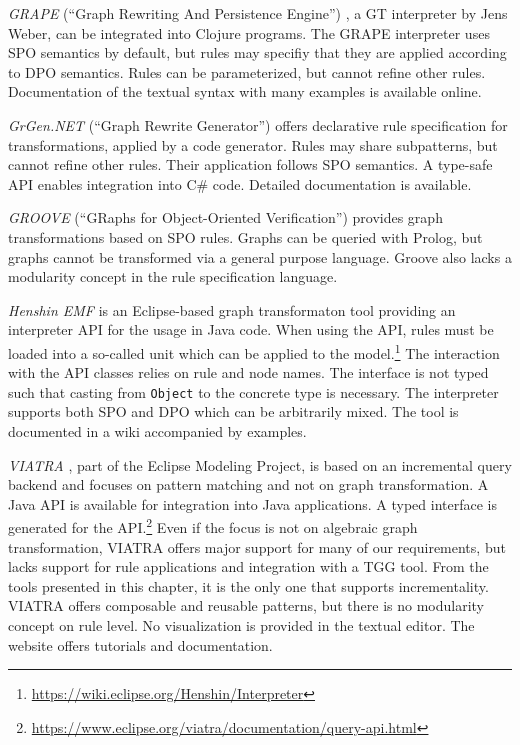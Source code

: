 \textit{GRAPE} (``Graph Rewriting And Persistence Engine'') \cite{GRAPE}, a GT interpreter by Jens Weber, can be integrated into Clojure programs.
The GRAPE interpreter uses SPO semantics by default, but rules may specifiy that they are applied according to DPO semantics.
Rules can be parameterized, but cannot refine other rules.
Documentation of the textual syntax \cite{GRAPEWebsite} with many examples is available online.

\textit{GrGen.NET} (``Graph Rewrite Generator'') \cite{GrGenWebsite} offers declarative rule specification for transformations, applied by a code generator.
Rules may share subpatterns, but cannot refine other rules.
Their application follows SPO semantics.
A type-safe API enables integration into C\# code.
Detailed documentation \cite{GrGenUserManual} is available.

\textit{GROOVE} (``GRaphs for Object-Oriented Verification'') \cite{GrooveWebsite} provides graph transformations based on SPO rules.
Graphs can be queried with Prolog, but graphs cannot be transformed via a general purpose language.
Groove also lacks a modularity concept in the rule specification language.

\textit{Henshin EMF} \cite{HenshinEMFWebsite} is an Eclipse-based graph transformaton tool providing an interpreter API for the usage in Java code.
When using the API, rules must be loaded into a so-called unit which can be applied to the model.\footnote{\url{https://wiki.eclipse.org/Henshin/Interpreter}}
The interaction with the API classes relies on rule and node names.
The interface is not typed such that casting from \texttt{Object} to the concrete type is necessary.
The interpreter supports both SPO and DPO which can be arbitrarily mixed.
The tool is documented in a wiki \cite{HenshinEMFWiki} accompanied by examples.

\textit{VIATRA} \cite{VIATRAWebsite}, part of the Eclipse Modeling Project, is based on an incremental query backend and focuses on pattern matching and not on graph transformation.
A Java API is available for integration into Java applications.
A typed interface is generated for the API.\footnote{\url{https://www.eclipse.org/viatra/documentation/query-api.html}}
Even if the focus is not on algebraic graph transformation, VIATRA offers major support for many of our requirements, but lacks support for rule applications and integration with a TGG tool.
From the tools presented in this chapter, it is the only one that supports incrementality.
VIATRA offers composable and reusable patterns, but there is no modularity concept on rule level.
No visualization is provided in the textual editor.
The website offers tutorials and documentation.

